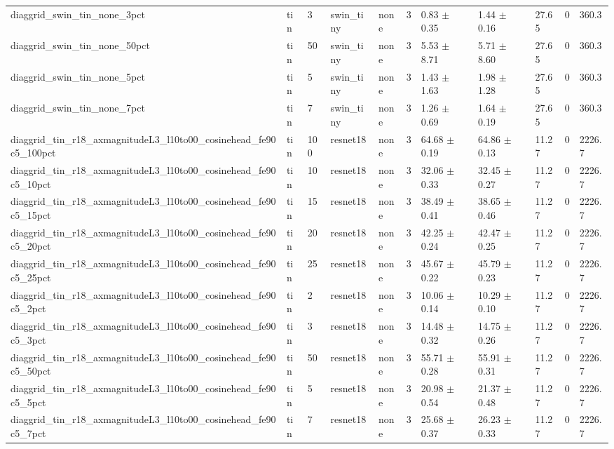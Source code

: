 \begin{tabular}{lllllllllll}
diaggrid_swin_tin_none_3pct & tin & 3 & swin_tiny & none & 3 & 0.83 $\pm$ 0.35 & 1.44 $\pm$ 0.16 & 27.65 & 0 & 360.3 \\
diaggrid_swin_tin_none_50pct & tin & 50 & swin_tiny & none & 3 & 5.53 $\pm$ 8.71 & 5.71 $\pm$ 8.60 & 27.65 & 0 & 360.3 \\
diaggrid_swin_tin_none_5pct & tin & 5 & swin_tiny & none & 3 & 1.43 $\pm$ 1.63 & 1.98 $\pm$ 1.28 & 27.65 & 0 & 360.3 \\
diaggrid_swin_tin_none_7pct & tin & 7 & swin_tiny & none & 3 & 1.26 $\pm$ 0.69 & 1.64 $\pm$ 0.19 & 27.65 & 0 & 360.3 \\
diaggrid_tin_r18_axmagnitudeL3_l10to00_cosinehead_fe90c5_100pct & tin & 100 & resnet18 & none & 3 & 64.68 $\pm$ 0.19 & 64.86 $\pm$ 0.13 & 11.27 & 0 & 2226.7 \\
diaggrid_tin_r18_axmagnitudeL3_l10to00_cosinehead_fe90c5_10pct & tin & 10 & resnet18 & none & 3 & 32.06 $\pm$ 0.33 & 32.45 $\pm$ 0.27 & 11.27 & 0 & 2226.7 \\
diaggrid_tin_r18_axmagnitudeL3_l10to00_cosinehead_fe90c5_15pct & tin & 15 & resnet18 & none & 3 & 38.49 $\pm$ 0.41 & 38.65 $\pm$ 0.46 & 11.27 & 0 & 2226.7 \\
diaggrid_tin_r18_axmagnitudeL3_l10to00_cosinehead_fe90c5_20pct & tin & 20 & resnet18 & none & 3 & 42.25 $\pm$ 0.24 & 42.47 $\pm$ 0.25 & 11.27 & 0 & 2226.7 \\
diaggrid_tin_r18_axmagnitudeL3_l10to00_cosinehead_fe90c5_25pct & tin & 25 & resnet18 & none & 3 & 45.67 $\pm$ 0.22 & 45.79 $\pm$ 0.23 & 11.27 & 0 & 2226.7 \\
diaggrid_tin_r18_axmagnitudeL3_l10to00_cosinehead_fe90c5_2pct & tin & 2 & resnet18 & none & 3 & 10.06 $\pm$ 0.14 & 10.29 $\pm$ 0.10 & 11.27 & 0 & 2226.7 \\
diaggrid_tin_r18_axmagnitudeL3_l10to00_cosinehead_fe90c5_3pct & tin & 3 & resnet18 & none & 3 & 14.48 $\pm$ 0.32 & 14.75 $\pm$ 0.26 & 11.27 & 0 & 2226.7 \\
diaggrid_tin_r18_axmagnitudeL3_l10to00_cosinehead_fe90c5_50pct & tin & 50 & resnet18 & none & 3 & 55.71 $\pm$ 0.28 & 55.91 $\pm$ 0.31 & 11.27 & 0 & 2226.7 \\
diaggrid_tin_r18_axmagnitudeL3_l10to00_cosinehead_fe90c5_5pct & tin & 5 & resnet18 & none & 3 & 20.98 $\pm$ 0.54 & 21.37 $\pm$ 0.48 & 11.27 & 0 & 2226.7 \\
diaggrid_tin_r18_axmagnitudeL3_l10to00_cosinehead_fe90c5_7pct & tin & 7 & resnet18 & none & 3 & 25.68 $\pm$ 0.37 & 26.23 $\pm$ 0.33 & 11.27 & 0 & 2226.7 \\

\end{tabular}
